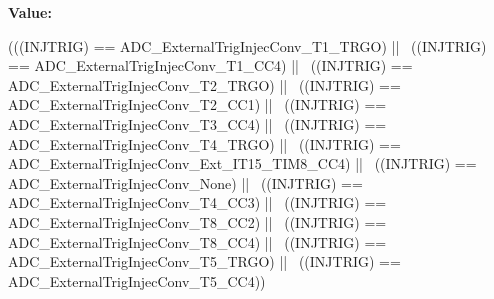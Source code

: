 \label{group__ADC__external__trigger__sources__for__injected__channels__conversion_ga3cb8cadbff46e432b5e000c3a7489a0b}
{\bfseries Value:}
\begin{DoxyCode}
(((INJTRIG) == ADC_ExternalTrigInjecConv_T1_TRGO) || \
                                        ((INJTRIG) == 
      ADC_ExternalTrigInjecConv_T1_CC4) || \
                                        ((INJTRIG) == 
      ADC_ExternalTrigInjecConv_T2_TRGO) || \
                                        ((INJTRIG) == 
      ADC_ExternalTrigInjecConv_T2_CC1) || \
                                        ((INJTRIG) == 
      ADC_ExternalTrigInjecConv_T3_CC4) || \
                                        ((INJTRIG) == 
      ADC_ExternalTrigInjecConv_T4_TRGO) || \
                                        ((INJTRIG) == 
      ADC_ExternalTrigInjecConv_Ext_IT15_TIM8_CC4) || \
                                        ((INJTRIG) == 
      ADC_ExternalTrigInjecConv_None) || \
                                        ((INJTRIG) == 
      ADC_ExternalTrigInjecConv_T4_CC3) || \
                                        ((INJTRIG) == 
      ADC_ExternalTrigInjecConv_T8_CC2) || \
                                        ((INJTRIG) == 
      ADC_ExternalTrigInjecConv_T8_CC4) || \
                                        ((INJTRIG) == 
      ADC_ExternalTrigInjecConv_T5_TRGO) || \
                                        ((INJTRIG) == 
      ADC_ExternalTrigInjecConv_T5_CC4))
\end{DoxyCode}
